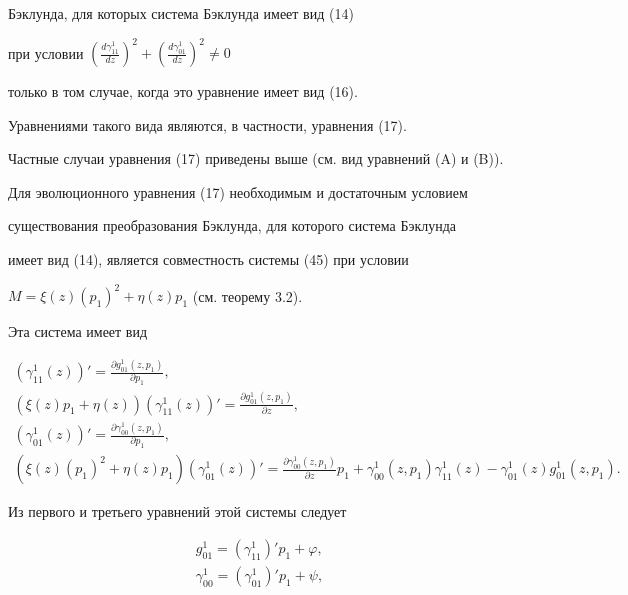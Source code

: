Бэклунда, для которых система Бэклунда имеет  вид (14)


при условии $({\frac{{d\gamma_{11}^1}}{{dz}}})^2+


({\frac{{d\gamma_{01}^1}}{{dz}}})^2 \ne 0$


только в том случае, когда это уравнение имеет вид (16).


Уравнениями такого вида являются, в частности, уравнения (17).


Частные случаи уравнения (17) приведены выше (см. вид уравнений (A) и (B)).





Для эволюционного уравнения (17) необходимым и достаточным условием 


существования преобразования Бэклунда, для которого система Бэклунда 


имеет вид (14), является совместность системы (45) при условии


$M=\xi (z) ({p_1})^2+\eta (z) p_1$ (см. теорему 3.2).


Эта система имеет вид


\begin{gather*}


({\gamma_{11}^1 (z)})'=\frac{{\partial g_{01}^1 ({z,p_1})}}{{\partial p_1}}, \\


%


({\xi (z) p_1+\eta (z)}) ({\gamma_{11}^1 (z)})'


=\frac{{\partial g_{01}^1 ({z,p_1})}}{{\partial z}}, \\


%


({\gamma_{01}^1 (z)})'=


\frac{{\partial \gamma_{00}^1 ({z,p_1})}}{{\partial p_1}}, \\


%


({\xi (z) ({p_1})^2+\eta (z) p_1}) ({\gamma_{01}^1 (z)})'


=\frac{{\partial \gamma_{00}^1 ({z,p_1})}}{{\partial z}} p_1+


\gamma_{00}^1 ({z,p_1}) \gamma_{11}^1 (z)-\gamma_{01}^1 (z)


g_{01}^1 ({z,p_1}). 


\end{gather*} 


Из первого и третьего уравнений этой системы следует


\begin{equation}


\begin{split}


g_{01}^1= ({\gamma_{11}^1})' p_1+\varphi, \\


\gamma_{00}^1= ({\gamma_{01}^1})' p_1+\psi, 


\end{split} 


\end{equation}


